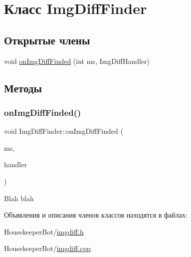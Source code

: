 \hypertarget{classImgDiffFinder}{}\section{Класс Img\+Diff\+Finder}
\label{classImgDiffFinder}
\subsection*{Открытые члены}
\begin{DoxyCompactItemize}
\item 
void \hyperlink{classImgDiffFinder_aa15b9c1049b95ad2ddc32829c6d92376}{on\+Img\+Diff\+Finded} (int ms, Img\+Diff\+Handler)
\end{DoxyCompactItemize}


\subsection{Методы}
\mbox{\label{classImgDiffFinder_aa15b9c1049b95ad2ddc32829c6d92376}} 
\subsubsection{\texorpdfstring{on\+Img\+Diff\+Finded()}{onImgDiffFinded()}}
{\footnotesize\ttfamily void Img\+Diff\+Finder\+::on\+Img\+Diff\+Finded (\begin{DoxyParamCaption}\item[{int}]{ms,  }\item[{Img\+Diff\+Finder\+::\+Img\+Diff\+Handler}]{handler }\end{DoxyParamCaption})}

Blah blah 

Объявления и описания членов классов находятся в файлах\+:\begin{DoxyCompactItemize}
\item 
Housekeeper\+Bot/\hyperlink{imgdiff_8h}{imgdiff.\+h}\item 
Housekeeper\+Bot/\hyperlink{imgdiff_8cpp}{imgdiff.\+cpp}\end{DoxyCompactItemize}

